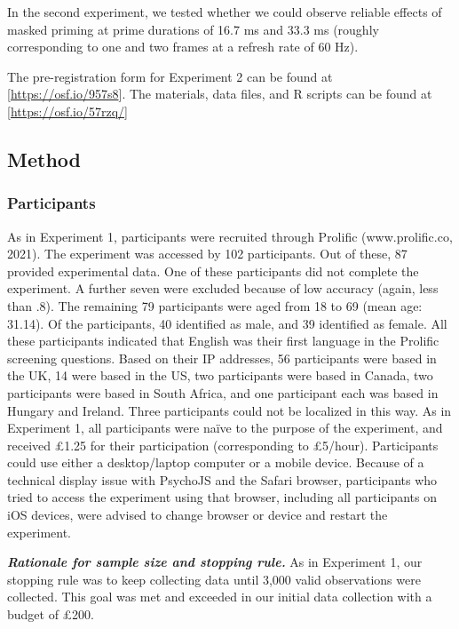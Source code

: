 \documentclass[
  english,
  man,floatsintext]{apa6}
\begin{document}
In the second experiment, we tested whether we could observe reliable effects of masked priming at prime durations of 16.7 ms and 33.3 ms (roughly corresponding to one and two frames at a refresh rate of 60 Hz).

The pre-registration form for Experiment 2 can be found at {[}\url{https://osf.io/957s8}{]}. The materials, data files, and R scripts can be found at {[}\url{https://osf.io/57rzq/}{]}

\hypertarget{method-1}{%
\subsection{Method}\label{method-1}}

\hypertarget{participants-1}{%
\subsubsection{Participants}\label{participants-1}}

As in Experiment 1, participants were recruited through Prolific (www.prolific.co, 2021). The experiment was accessed by 102 participants. Out of these, 87 provided experimental data. One of these participants did not complete the experiment. A further seven were excluded because of low accuracy (again, less than .8). The remaining 79 participants were aged from 18 to 69 (mean age: 31.14). Of the participants, 40 identified as male, and 39 identified as female. All these participants indicated that English was their first language in the Prolific screening questions. Based on their IP addresses, 56 participants were based in the UK, 14 were based in the US, two participants were based in Canada, two participants were based in South Africa, and one participant each was based in Hungary and Ireland. Three participants could not be localized in this way. As in Experiment 1, all participants were naïve to the purpose of the experiment, and received £1.25 for their participation (corresponding to £5/hour). Participants could use either a desktop/laptop computer or a mobile device. Because of a technical display issue with PsychoJS and the Safari browser, participants who tried to access the experiment using that browser, including all participants on iOS devices, were advised to change browser or device and restart the experiment.

\textbf{\emph{Rationale for sample size and stopping rule.}} As in Experiment 1, our stopping rule was to keep collecting data until 3,000 valid observations were collected. This goal was met and exceeded in our initial data collection with a budget of £200.
\end{document}
